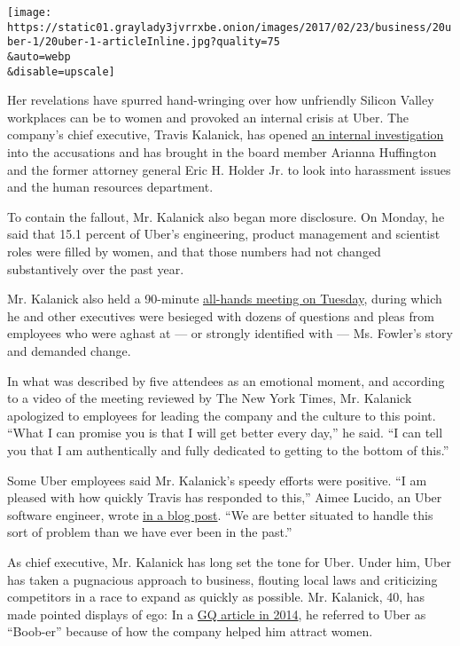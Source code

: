 \texttt{[image: https://static01.graylady3jvrrxbe.onion/images/2017/02/23/business/20uber-1/20uber-1-articleInline.jpg?quality=75\\\&auto=webp\\\&disable=upscale]}

Her revelations have spurred hand-wringing over how unfriendly Silicon
Valley workplaces can be to women and provoked an internal crisis at
Uber. The company's chief executive, Travis Kalanick, has opened
\href{https://www.nytimes3xbfgragh.onion/2017/02/19/business/uber-sexual-harassment-investigation.html}{an
internal investigation} into the accusations and has brought in the
board member Arianna Huffington and the former attorney general Eric H.
Holder Jr. to look into harassment issues and the human resources
department.

To contain the fallout, Mr. Kalanick also began more disclosure. On
Monday, he said that 15.1 percent of Uber's engineering, product
management and scientist roles were filled by women, and that those
numbers had not changed substantively over the past year.

Mr. Kalanick also held a 90-minute
\href{https://newsroom.uber.com/ariannaupdate/}{all-hands meeting on
Tuesday}, during which he and other executives were besieged with dozens
of questions and pleas from employees who were aghast at --- or strongly
identified with --- Ms. Fowler's story and demanded change.

In what was described by five attendees as an emotional moment, and
according to a video of the meeting reviewed by The New York Times, Mr.
Kalanick apologized to employees for leading the company and the culture
to this point. ``What I can promise you is that I will get better every
day,'' he said. ``I can tell you that I am authentically and fully
dedicated to getting to the bottom of this.''

Some Uber employees said Mr. Kalanick's speedy efforts were positive.
``I am pleased with how quickly Travis has responded to this,'' Aimee
Lucido, an Uber software engineer, wrote
\href{https://medium.com/@hadrad1000/reflecting-on-susan-fowlers-reflections-e2dccb374b47\#.gwyl18wzu}{in
a blog post}. ``We are better situated to handle this sort of problem
than we have ever been in the past.''

As chief executive, Mr. Kalanick has long set the tone for Uber. Under
him, Uber has taken a pugnacious approach to business, flouting local
laws and criticizing competitors in a race to expand as quickly as
possible. Mr. Kalanick, 40, has made pointed displays of ego: In a
\href{http://www.gq.com/story/uber-cab-confessions?currentPage=1}{GQ
article in 2014}, he referred to Uber as ``Boob-er'' because of how the
company helped him attract women.

